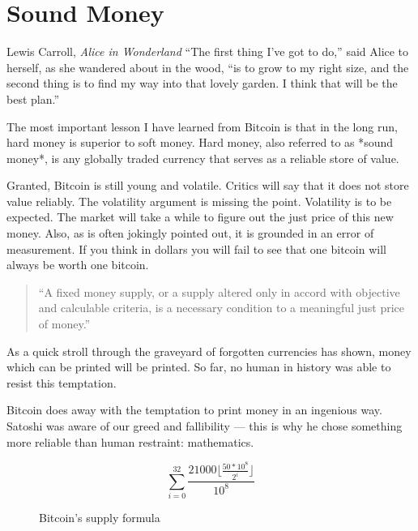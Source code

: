 \chapter{ Sound Money}
\label{les:14}

\begin{chapquote}{Lewis Carroll, \textit{Alice in Wonderland}}
``The first thing I've got to do,'' said Alice to herself, as she wandered about
in the wood, ``is to grow to my right size, and the second thing is to find my
way into that lovely garden. I think that will be the best plan.''
\end{chapquote}

The most important lesson I have learned from Bitcoin is that in the
long run, hard money is superior to soft money. Hard money, also
referred to as *sound money*, is any globally traded currency that
serves as a reliable store of value.

Granted, Bitcoin is still young and volatile. Critics will say that it
does not store value reliably. The volatility argument is missing the
point. Volatility is to be expected. The market will take a while to
figure out the just price of this new money. Also, as is often jokingly
pointed out, it is grounded in an error of measurement. If you think in
dollars you will fail to see that one bitcoin will always be worth one
bitcoin.

\begin{quotation}
``A fixed money supply, or a supply altered only in accord with
objective and calculable criteria, is a necessary condition to a
meaningful just price of money.''
\end{quotation}

As a quick stroll through the graveyard of forgotten currencies has
shown, money which can be printed will be printed. So far, no human in
history was able to resist this temptation.

Bitcoin does away with the temptation to print money in an ingenious
way. Satoshi was aware of our greed and fallibility --- this is why he
chose something more reliable than human restraint: mathematics.

\begin{figure}
  \centering
  \begin{equation}
  \sum\limits_{i=0}^{32} \frac{21000 \lfloor \frac{50*10^8}{2^i} \rfloor}{10^8}
  \end{equation}
  \caption{Bitcoin's supply formula}
  \label{fig:supply-formula-white}
\end{figure}


